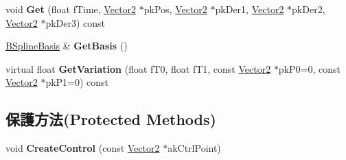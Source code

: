 \begin{DoxyCompactItemize}
\item 
void {\bfseries Get} (float f\+Time, \hyperlink{class_i_dream_sky_1_1_vector2}{Vector2} $\ast$pk\+Pos, \hyperlink{class_i_dream_sky_1_1_vector2}{Vector2} $\ast$pk\+Der1, \hyperlink{class_i_dream_sky_1_1_vector2}{Vector2} $\ast$pk\+Der2, \hyperlink{class_i_dream_sky_1_1_vector2}{Vector2} $\ast$pk\+Der3) const \hypertarget{class_i_dream_sky_1_1_b_spline_curve2_ac3f33aee543607a83d30c1094a190947}{}\label{class_i_dream_sky_1_1_b_spline_curve2_ac3f33aee543607a83d30c1094a190947}

\item 
\hyperlink{class_i_dream_sky_1_1_b_spline_basis}{B\+Spline\+Basis} \& {\bfseries Get\+Basis} ()\hypertarget{class_i_dream_sky_1_1_b_spline_curve2_a3b4a57d787a76190223e696d900900c4}{}\label{class_i_dream_sky_1_1_b_spline_curve2_a3b4a57d787a76190223e696d900900c4}

\item 
virtual float {\bfseries Get\+Variation} (float f\+T0, float f\+T1, const \hyperlink{class_i_dream_sky_1_1_vector2}{Vector2} $\ast$pk\+P0=0, const \hyperlink{class_i_dream_sky_1_1_vector2}{Vector2} $\ast$pk\+P1=0) const \hypertarget{class_i_dream_sky_1_1_b_spline_curve2_a40bf63f3ad2bce0de4c163cbc272032c}{}\label{class_i_dream_sky_1_1_b_spline_curve2_a40bf63f3ad2bce0de4c163cbc272032c}

\end{DoxyCompactItemize}
\subsection*{保護方法(Protected Methods)}
\begin{DoxyCompactItemize}
\item 
void {\bfseries Create\+Control} (const \hyperlink{class_i_dream_sky_1_1_vector2}{Vector2} $\ast$ak\+Ctrl\+Point)\hypertarget{class_i_dream_sky_1_1_b_spline_curve2_abed68c4797c92223abd635f85516d046}{}\label{class_i_dream_sky_1_1_b_spline_curve2_abed68c4797c92223abd635f85516d046}

\end{DoxyCompactItemize}

